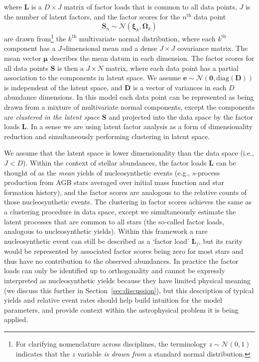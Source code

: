 \documentclass[twocolumn]{aastex62}
\newcommand{\vect}[1]{\boldsymbol{\mathbf{#1}}}
\renewcommand{\vec}[1]{\vect{#1}}
\newcommand{\factorloads}{\textbf{L}}
\newcommand{\factorscores}{\textbf{S}}
\newcommand{\specificvariance}{\vec{D}}
\newcommand{\NumData}{N}
\newcommand{\NumDimensions}{D}
\newcommand{\numdata}{n}
\newcommand{\NumLatentFactors}{J}
\newcommand{\numlatentfactors}{j}
\newcommand{\numcomponents}{k}
\begin{document}
\noindent{}where $\factorloads$ is a $\NumDimensions \times \NumLatentFactors$ 
matrix of factor loads that is common to all data points, $\NumLatentFactors$ is
the number of latent factors, and the factor scores 
for the $\numdata^\mathrm{th}$ data point
\begin{equation}
	\factorscores_\numdata \sim \mathcal{N}(\vec\xi_\numcomponents, \vec\Omega_\numcomponents)
\end{equation}
\noindent{}are drawn from\footnote{For clarifying nomenclature across disciplines, the terminology $z \sim \mathcal{N}(0, 1)$ indicates that the $z$ variable \emph{is drawn from} a standard normal distribution.} the $\numcomponents^\mathrm{th}$ multivariate
normal distribution, where each $\numcomponents^\mathrm{th}$ component has a $\NumLatentFactors$-dimensional mean and a dense $\NumLatentFactors \times \NumLatentFactors$ covariance matrix.
The mean vector $\vec\mu$ describes the mean datum in each dimension.
The factor scores for all data points $\factorscores$ is then a 
$\NumLatentFactors \times \NumData$ matrix, where each data point has a partial
association to the components in latent space. 
We assume $\vec{e} \sim \mathcal{N}\left(\vec{0}, \textrm{diag}(\specificvariance)\right)$
is independent of the latent space, and $\specificvariance$ is a
vector of variances in each $\NumDimensions$ abundance dimensions.
In this model each data point can be represented as being drawn
from a mixture of multivariate normal components, except the components
are \emph{clustered in the latent space} $\factorscores$ and projected
into the data space by the factor loads $\factorloads$. In a sense we
are using latent factor analysis as a form of dimensionality reduction and
simultaneously performing clustering in latent space.


We assume that the latent space is lower dimensionality than the
data space (i.e., $\NumLatentFactors < \NumDimensions$).
Within the context of stellar abundances, the factor loads
$\factorloads$ can be thought of as the \emph{mean} yields
of nucleosynthetic
events (e.g., $s$-process production from AGB stars averaged over
initial mass function and star formation history), and the
factor scores are analogous to the relative counts of those 
nucleosynthetic events. The clustering in factor scores
achieves the same as a clustering procedure in data space,
except we simultaneously estimate the latent processes that are
common to all stars (the so-called factor loads, analogous to 
nucleosynthetic yields). Within this framework a rare nucleosynthetic event
can still be described as a `factor load' $\factorloads_\numlatentfactors$, 
but its rarity would be represented by associated factor
scores being zero for most stars and thus have no contribution
to the observed abundances. In practice the factor loads can only be 
identified up to orthogonality and cannot be expressly interpreted as
nucleosynthetic yields because they have limited physical meaning
(we discuss this further in Section~\ref{sec:discussion}),
but this description of typical yields and relative event rates should
help build intuition for the model parameters, and provide context
within the astrophysical problem it is being applied.
\end{document}
